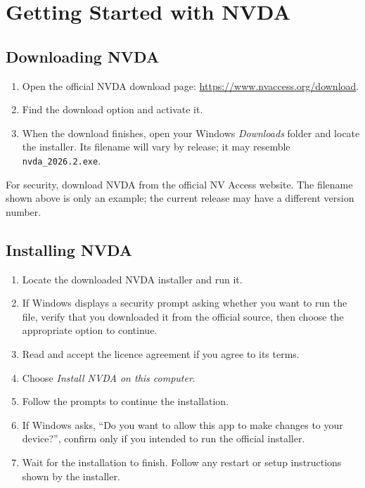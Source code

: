 \documentclass[11pt,oneside]{book}
\begin{document}
\tableofcontents
\mainmatter

\part{Getting Started with NVDA}

\chapter{Downloading NVDA}
\begin{enumerate}
	\item Open the official NVDA download page: \url{https://www.nvaccess.org/download}.
	\item Find the download option and activate it.
	\item When the download finishes, open your Windows \textit{Downloads} folder and locate the installer. Its filename will vary by release; it may resemble \texttt{nvda\_2026.2.exe}.
\end{enumerate}
For security, download NVDA from the official NV Access website. The filename shown above is only an example; the current release may have a different version number.

\chapter{Installing NVDA}
\begin{enumerate}
	\item Locate the downloaded NVDA installer and run it.
	\item If Windows displays a security prompt asking whether you want to run the file, verify that you downloaded it from the official source, then choose the appropriate option to continue.
	\item Read and accept the licence agreement if you agree to its terms.
	\item Choose \textit{Install NVDA on this computer}.
	\item Follow the prompts to continue the installation.
	\item If Windows asks, ``Do you want to allow this app to make changes to your device?'', confirm only if you intended to run the official installer.
	\item Wait for the installation to finish. Follow any restart or setup instructions shown by the installer.
\end{enumerate}
\end{document}
